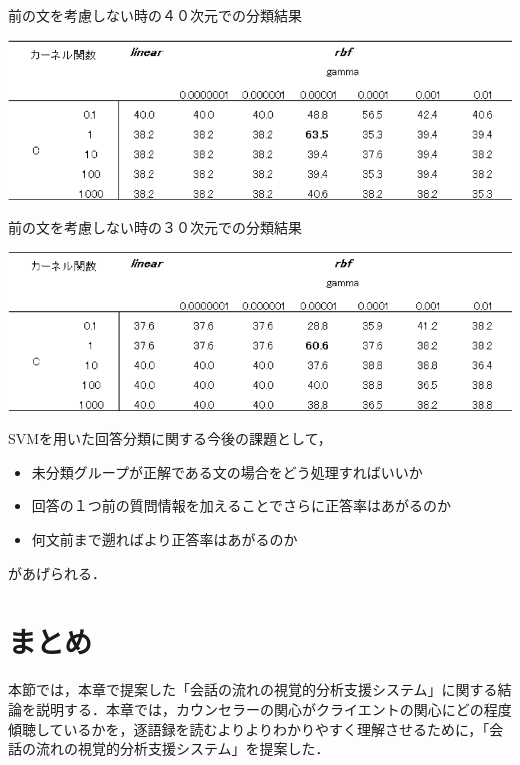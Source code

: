 \documentclass[shuuron]{kuee}
\begin{document}
\begin{table}
  \caption{前の文を考慮しない時の４０次元での分類結果}
  \label{table:hayashida3}
  \begin{center}
    \includegraphics[width=\linewidth]{hayashida3.png}
  \end{center}
\end{table}

\begin{table}
  \caption{前の文を考慮しない時の３０次元での分類結果}
  \label{table:hayashida4}
  \begin{center}
    \includegraphics[width=\linewidth]{hayashida4.png}
  \end{center}
\end{table}

SVMを用いた回答分類に関する今後の課題として，
\begin{itemize}
  \item 未分類グループが正解である文の場合をどう処理すればいいか
  \item 回答の１つ前の質問情報を加えることでさらに正答率はあがるのか
  \item   何文前まで遡ればより正答率はあがるのか
\end{itemize}
があげられる．


\section{まとめ}

本節では，本章で提案した「会話の流れの視覚的分析支援システム」に関する結論を説明する．本章では，カウンセラーの関心がクライエントの関心にどの程度傾聴しているかを，逐語録を読むよりよりわかりやすく理解させるために，「会話の流れの視覚的分析支援システム」を提案した．
\end{document}
